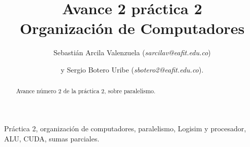 \documentclass[%
	final,
	notitlepage,
	narroweqnarray,
	inline,
	twoside,
	]{ieee}
\begin{document}
\title[Avance  práctica 2]{%
       Avance 2 práctica 2 \\  Organización de Computadores}

\author[]{Sebastián Arcila Valenzuela (\textit{sarcilav@eafit.edu.co})
\and{}y Sergio Botero Uribe (\textit{sbotero2@eafit.edu.co}).
}


\titletext{, \today} 


\maketitle               

\begin{abstract} 
Avance número 2 de la práctica 2, sobre paralelismo.
\end{abstract}

\begin{keywords}
Práctica 2, organización de computadores, paralelismo, Logisim y procesador, ALU, CUDA, sumas parciales.
\end{keywords}
\end{document}
